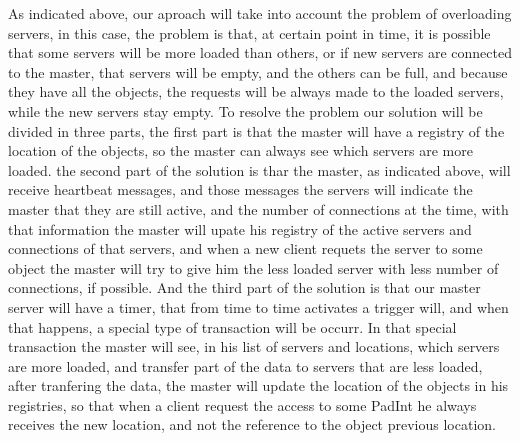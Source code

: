 \documentclass[times, 10pt,twocolumn]{article}
\begin{document}

As indicated above, our aproach will take into account the problem of overloading servers, in this case, the problem is that, at certain point in time, it is possible that some servers will be more loaded than others, or if new servers are connected to the master, that servers will be empty, and the others can be full, and because they have all the objects, the requests will be always made to the loaded servers, while the new servers stay empty. To resolve the problem our solution will be divided in three parts, the first part is that the master will have a registry of the location of the objects, so the master can always see which servers are more loaded. the second part of the solution is thar the master, as indicated above, will receive heartbeat messages, and those messages the servers will indicate the master that they are still active, and the number of connections at the time, with that information the master will upate his registry of the active servers and connections of that servers, and when a new client requets the server to some object the master will try to give him the less loaded server  with less number of connections, if possible. And the third part of the solution is that our master server will have a timer, that from time to time activates a trigger will, and when that happens, a special type of transaction will be occurr. In that special transaction the master will see, in his list of servers and locations, which servers are more loaded, and transfer part of the data to servers that are less loaded, after tranfering the data, the master will update the location of the objects in his registries, so that when a client request the access to some PadInt he always receives the new location, and not the reference to the object previous location.  

\end{document}
